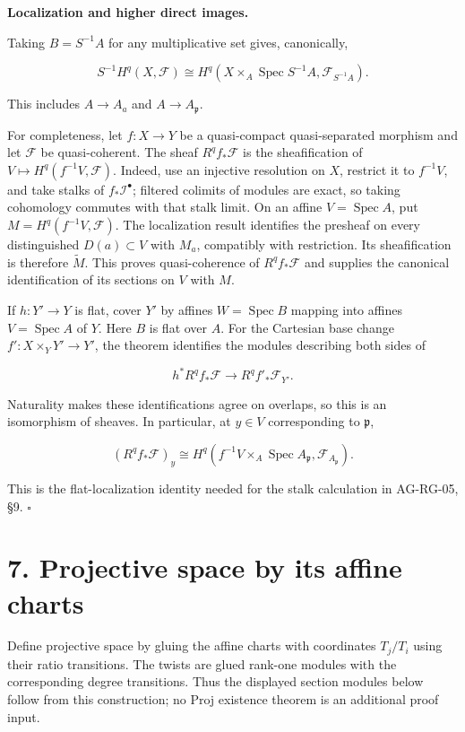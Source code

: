 \documentclass[11pt,a4paper,openany]{report}
\begin{document}
\textbf{Localization and higher direct images.}

Taking \(B=S^{-1}A\) for any multiplicative set gives, canonically,

\[
S^{-1}H^q(X,\mathcal F)\cong
H^q(X\times_A\operatorname{Spec}S^{-1}A,\mathcal F_{S^{-1}A}).
\]

This includes \(A\to A_a\) and \(A\to A_{\mathfrak p}\).

For completeness, let \(f:X\to Y\) be a quasi-compact quasi-separated morphism and let \(\mathcal F\) be quasi-coherent. The sheaf \(R^qf_*\mathcal F\) is the sheafification of \(V\mapsto H^q(f^{-1}V,\mathcal F)\). Indeed, use an injective resolution on \(X\), restrict it to \(f^{-1}V\), and take stalks of \(f_*\mathcal I^\bullet\); filtered colimits of modules are exact, so taking cohomology commutes with that stalk limit. On an affine \(V=\operatorname{Spec}A\), put \(M=H^q(f^{-1}V,\mathcal F)\). The localization result identifies the presheaf on every distinguished \(D(a)\subset V\) with \(M_a\), compatibly with restriction. Its sheafification is therefore \(\widetilde M\). This proves quasi-coherence of \(R^qf_*\mathcal F\) and supplies the canonical identification of its sections on \(V\) with \(M\).

If \(h:Y'\to Y\) is flat, cover \(Y'\) by affines \(W=\operatorname{Spec}B\) mapping into affines \(V=\operatorname{Spec}A\) of \(Y\). Here \(B\) is flat over \(A\). For the Cartesian base change \(f':X\times_Y Y'\to Y'\), the theorem identifies the modules describing both sides of

\[
h^*R^qf_*\mathcal F\longrightarrow R^qf'_*\mathcal F_{Y'}.
\]

Naturality makes these identifications agree on overlaps, so this is an isomorphism of sheaves. In particular, at \(y\in V\) corresponding to \(\mathfrak p\),

\[
(R^qf_*\mathcal F)_y\cong
H^q(f^{-1}V\times_A\operatorname{Spec}A_{\mathfrak p},\mathcal F_{A_{\mathfrak p}}).
\]

This is the flat-localization identity needed for the stalk calculation in AG-RG-05, §9. \(\square\)

\section{7. Projective space by its affine charts}\label{AG-RG-S01-projective-space-by-its-affine-charts}

Define projective space by gluing the affine charts with coordinates \(T_j/T_i\) using their ratio transitions. The twists are glued rank-one modules with the corresponding degree transitions. Thus the displayed section modules below follow from this construction; no Proj existence theorem is an additional proof input.
\end{document}
